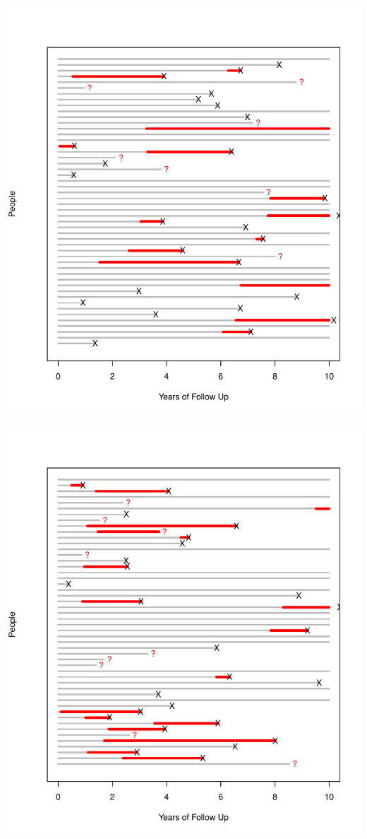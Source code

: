 \documentclass{article}
\begin{document}
\includegraphics{incidence-graphs-seven}

\includegraphics{incidence-graphs-eight}
\end{document}
